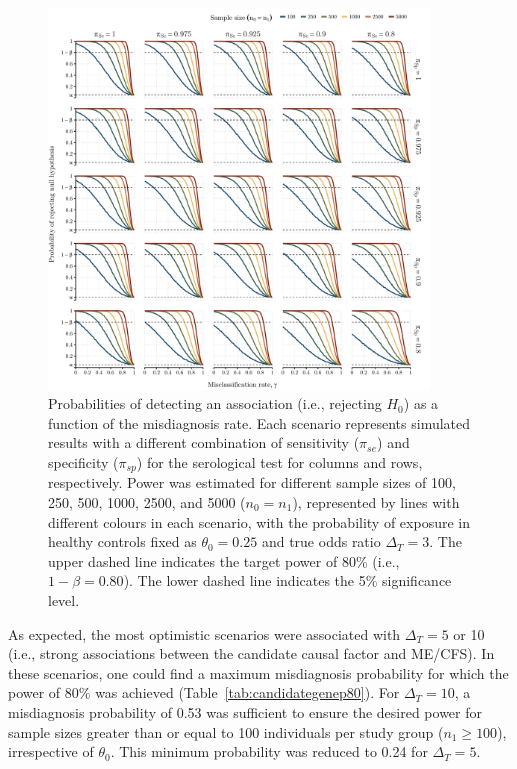 \begin{figure}
    \centering\includegraphics[width=0.9\textwidth,height=\textheight,keepaspectratio]{chapter/2023-misdiagnosis/figures/fig2-simulations-serology-or-3.pdf}
    \caption[Probabilities of detecting an association as a function of the misdiagnosis rate considering different combinations of sensitivity and specificity]{Probabilities of detecting an association (i.e., rejecting $H_0$) as a function of the misdiagnosis rate. Each scenario represents simulated results with a different combination of sensitivity ($\pi_{se}$) and specificity ($\pi_{sp}$) for the serological test for columns and rows, respectively. Power was estimated for different sample sizes of 100, 250, 500, 1000, 2500, and 5000 ($n_0 = n_1$), represented by lines with different colours in each scenario, with the probability of exposure in healthy controls fixed as $\theta_0 = 0.25$ and true odds ratio $\Delta_T = 3$. The upper dashed line indicates the target power of 80\% (i.e., $1-\beta = 0.80$). The lower dashed line indicates the 5\% significance level.}
    \label{fig:resultsserology}
\end{figure}

As expected, the most optimistic scenarios were associated with $\Delta_T = 5$ or 10 (i.e., strong associations between the candidate causal factor and ME/CFS). In these scenarios, one could find a maximum misdiagnosis probability for which the power of 80\% was achieved (Table~\ref{tab:candidategenep80}). For $\Delta_T = 10$, a misdiagnosis probability of 0.53 was sufficient to ensure the desired power for sample sizes greater than or equal to 100 individuals per study group ($n_1 \geq 100$), irrespective of $\theta_0$. This minimum probability was reduced to 0.24 for $\Delta_T = 5$.


